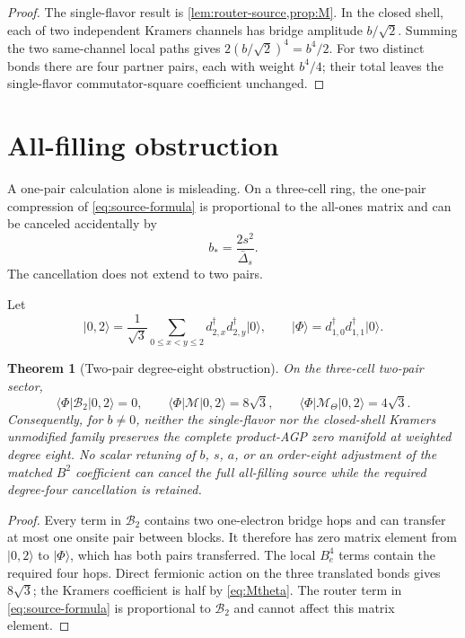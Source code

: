 \documentclass[11pt]{article}
\newtheorem{theorem}{Theorem}[section]
\theoremstyle{definition}
\theoremstyle{remark}
\newcommand{\cM}{\mathcal M}
\newcommand{\cB}{\mathcal B}
\newcommand{\ket}[1]{\lvert #1\rangle}
\newcommand{\bra}[1]{\langle #1\rvert}
\begin{document}
\begin{proof}
The single-flavor result is \cref{lem:router-source,prop:M}.  In the closed shell, each of two independent Kramers channels has bridge amplitude $b/\sqrt2$.  Summing the two same-channel local paths gives $2(b/\sqrt2)^4=b^4/2$.  For two distinct bonds there are four partner pairs, each with weight $b^4/4$; their total leaves the single-flavor commutator-square coefficient unchanged.
\end{proof}

\section{All-filling obstruction}

A one-pair calculation alone is misleading.  On a three-cell ring, the one-pair compression of \eqref{eq:source-formula} is proportional to the all-ones matrix and can be canceled accidentally by
\begin{equation}
 b_*=\frac{2s^2}{\bar\Delta_s}.
 \label{eq:bstar}
\end{equation}
The cancellation does not extend to two pairs.

Let
\begin{equation}
 \ket{0,2}=\frac1{\sqrt3}\sum_{0\le x<y\le2}
 d_{2,x}^\dagger d_{2,y}^\dagger\ket0,
 \qquad
 \ket\Phi=d_{1,0}^\dagger d_{1,1}^\dagger\ket0.
 \label{eq:witness-states}
\end{equation}

\begin{theorem}[Two-pair degree-eight obstruction]
\label{thm:obstruction}
On the three-cell two-pair sector,
\begin{equation}
 \bra\Phi\cB_2\ket{0,2}=0,
 \qquad
 \bra\Phi\cM\ket{0,2}=8\sqrt3,
 \qquad
 \bra\Phi\cM_\Theta\ket{0,2}=4\sqrt3.
 \label{eq:witness}
\end{equation}
Consequently, for $b\ne0$, neither the single-flavor nor the closed-shell Kramers unmodified family preserves the complete product-AGP zero manifold at weighted degree eight.  No scalar retuning of $b$, $s$, $a$, or an order-eight adjustment of the matched $B^2$ coefficient can cancel the full all-filling source while the required degree-four cancellation is retained.
\end{theorem}

\begin{proof}
Every term in $\cB_2$ contains two one-electron bridge hops and can transfer at most one onsite pair between blocks.  It therefore has zero matrix element from $\ket{0,2}$ to $\ket\Phi$, which has both pairs transferred.  The local $B_e^4$ terms contain the required four hops.  Direct fermionic action on the three translated bonds gives $8\sqrt3$; the Kramers coefficient is half by \eqref{eq:Mtheta}.  The router term in \eqref{eq:source-formula} is proportional to $\cB_2$ and cannot affect this matrix element.
\end{proof}
\end{document}
